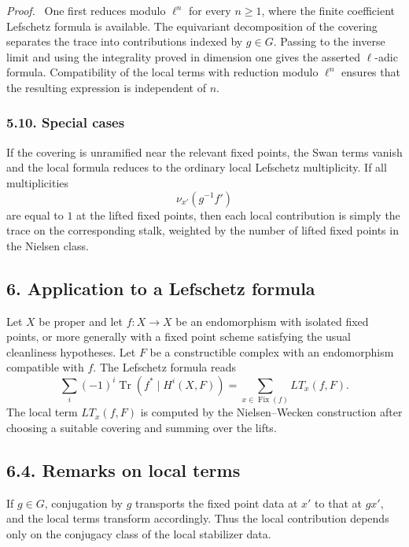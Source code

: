 \documentclass[11pt]{article}
\theoremstyle{plain}
\theoremstyle{definition}
\theoremstyle{remark}
\newenvironment{prooftext}{\par\noindent\textit{Proof.}\ }{\par\medskip}
\begin{document}
\begin{prooftext}
One first reduces modulo $\ell^n$ for every $n\ge1$, where the finite coefficient Lefschetz formula is available. The equivariant decomposition of the covering separates the trace into contributions indexed by $g\in G$. Passing to the inverse limit and using the integrality proved in dimension one gives the asserted $\ell$-adic formula. Compatibility of the local terms with reduction modulo $\ell^n$ ensures that the resulting expression is independent of $n$.
\end{prooftext}

\subsubsection*{5.10. Special cases}

If the covering is unramified near the relevant fixed points, the Swan terms vanish and the local formula reduces to the ordinary local Lefschetz multiplicity. If all multiplicities
\[
   \nu_{x'}(g^{-1}f')
\]
are equal to $1$ at the lifted fixed points, then each local contribution is simply the trace on the corresponding stalk, weighted by the number of lifted fixed points in the Nielsen class.

\subsection*{6. Application to a Lefschetz formula}

Let $X$ be proper and let $f:X\to X$ be an endomorphism with isolated fixed points, or more generally with a fixed point scheme satisfying the usual cleanliness hypotheses. Let $F$ be a constructible complex with an endomorphism compatible with $f$. The Lefschetz formula reads
\[
   \sum_i(-1)^i\operatorname{Tr}(f^*\mid H^i(X,F))
      =\sum_{x\in \operatorname{Fix}(f)}LT_x(f,F).
\]
The local term $LT_x(f,F)$ is computed by the Nielsen--Wecken construction after choosing a suitable covering and summing over the lifts.

\subsection*{6.4. Remarks on local terms}

If $g\in G$, conjugation by $g$ transports the fixed point data at $x'$ to that at $gx'$, and the local terms transform accordingly. Thus the local contribution depends only on the conjugacy class of the local stabilizer data.
\end{document}
